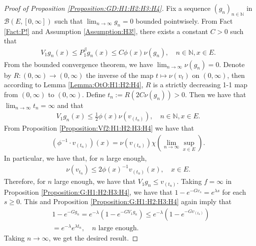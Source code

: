 \documentclass[12pt,a4paper]{amsart}
\numberwithin{equation}{section}
\theoremstyle{plain}
\theoremstyle{definition}
\theoremstyle{remark}
\begin{document}
\begin{proof}[Proof of Proposition \ref{Proposition:GD:H1:H2:H3:H4}]
Fix a sequence $(g_{n})_{n\in \mathbb N}$ in $\mathcal B(E,[0,\infty])$ 
such that $\lim_{n\to\infty}g_n=0$ bounded pointwisely.
From Fact \ref{Fact:P!} and Assumption \ref{Assumption:H3!}, there exists a constant $C > 0$ such that
\begin{align}
V_1 g_n(x) \leq P^\beta_1 g_n(x) \leq C \phi(x) \nu(g_n),
\quad n \in \mathbb N, x\in E.
\end{align}
From the bounded convergence theorem, we have $\lim_{n\to \infty}\nu(g_n) =0$.
Denote by $R:(0,\infty) \to (0,\infty)$ the inverse of the map $t \mapsto \nu(v_t)$ on $(0,\infty)$, then according to Lemma \ref{Lemma:OtO:H1:H2:H4}, $R$ is a strictly decreasing 1-1 map from $(0,\infty)$ to $(0,\infty)$.
Define $t_n:= R(2C\nu(g_n))> 0$.
Then we have that $\lim_{n\to \infty} t_n = \infty$ and that
\begin{align}
V_1 g_n(x) \leq \frac{1}{2} \phi(x) \nu(v_{(t_n)}),
\quad n \in \mathbb N, x\in E.
\end{align}
From Proposition \ref{Proposition:Vf2:H1:H2:H3:H4} we have that
\begin{align}
(\phi^{-1} \cdot v_{(t_n)})(x)
= \nu(v_{(t_n)}) \chi(\lim_{n\to \infty} \sup_{x\in E}).
\end{align}
In particular, we have that, for $n$ large enough,
\begin{align}
\nu(v_{t_n}) \leq 2 \phi(x)^{-1} v_{(t_n)}(x),
\quad x\in E.
\end{align}
Therefore, for $n$ large enough, we have that $V_1g_n \leq v_{(t_n)}$.
Taking $f = \infty$ in Proposition \ref{Proposition:G:H1:H2:H3:H4}, we have that $1 - e^{- Gv_s} = e^{\lambda s}$ for each $s\geq 0$.
This and Proposition \ref{Proposition:G:H1:H2:H3:H4} again imply that
\begin{align}
& 1 - e^{- Gg_n}
= e^{- \lambda} (1- e^{- GV_1g_n})
\leq e^{- \lambda} (1- e^{- G v_{(t_n)}})
\\& = e^{- \lambda} e^{\lambda t_n},
\quad \text{$n$ large enough.}
\end{align}
Taking $n\to \infty$, we get the desired result.
\end{proof}
\appendix
\section{}
\end{document}
